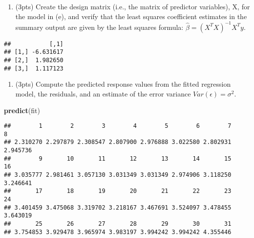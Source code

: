 \documentclass[
]{article}
\newenvironment{Shaded}{\begin{snugshade}}{\end{snugshade}}
\newcommand{\AttributeTok}[1]{\textcolor[rgb]{0.13,0.29,0.53}{#1}}
\newcommand{\DecValTok}[1]{\textcolor[rgb]{0.00,0.00,0.81}{#1}}
\newcommand{\FunctionTok}[1]{\textcolor[rgb]{0.13,0.29,0.53}{\textbf{#1}}}
\newcommand{\NormalTok}[1]{#1}
\newcommand{\OtherTok}[1]{\textcolor[rgb]{0.56,0.35,0.01}{#1}}
\newcommand{\SpecialCharTok}[1]{\textcolor[rgb]{0.81,0.36,0.00}{\textbf{#1}}}
\providecommand{\tightlist}{%
  \setlength{\itemsep}{0pt}\setlength{\parskip}{0pt}}
\begin{document}
\begin{enumerate}
\def\labelenumi{(\alph{enumi})}
\setcounter{enumi}{5}
\tightlist
\item
  (3pts) Create the design matrix (i.e., the matrix of predictor
  variables), X, for the model in (e), and verify that the least squares
  coefficient estimates in the summary output are given by the least
  squares formula: \(\hat\beta = (X^TX)^{-1}X^Ty\).
\end{enumerate}

\begin{Shaded}
\end{Shaded}

\begin{verbatim}
##           [,1]
## [1,] -6.631617
## [2,]  1.982650
## [3,]  1.117123
\end{verbatim}

\begin{enumerate}
\def\labelenumi{(\alph{enumi})}
\setcounter{enumi}{6}
\tightlist
\item
  (3pts) Compute the predicted response values from the fitted
  regression model, the residuals, and an estimate of the error variance
  \(Var(\epsilon) = \sigma^2\).
\end{enumerate}

\begin{Shaded}
\begin{Highlighting}[]
\FunctionTok{predict}\NormalTok{(fit)}
\end{Highlighting}
\end{Shaded}

\begin{verbatim}
##        1        2        3        4        5        6        7        8 
## 2.310270 2.297879 2.308547 2.807900 2.976888 3.022580 2.802931 2.945736 
##        9       10       11       12       13       14       15       16 
## 3.035777 2.981461 3.057130 3.031349 3.031349 2.974906 3.118250 3.246641 
##       17       18       19       20       21       22       23       24 
## 3.401459 3.475068 3.319702 3.218167 3.467691 3.524097 3.478455 3.643019 
##       25       26       27       28       29       30       31 
## 3.754853 3.929478 3.965974 3.983197 3.994242 3.994242 4.355446
\end{verbatim}
\end{document}
